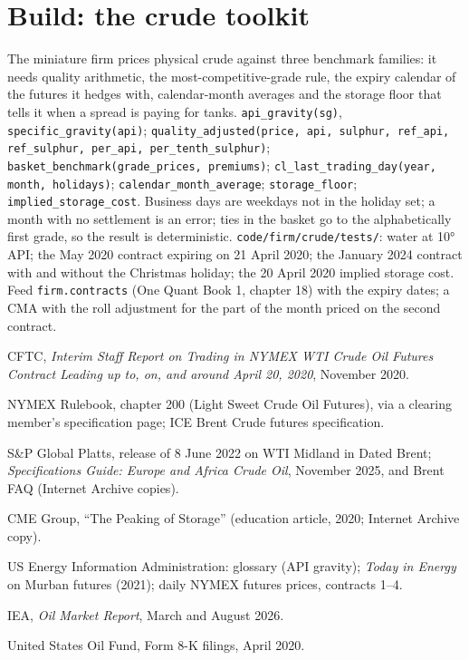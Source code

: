 \section{Build: the crude toolkit}\label{bld:m3:crude-oil:crude}

\begin{build}
 The miniature firm prices physical crude against three benchmark
families: it needs quality arithmetic, the most-competitive-grade rule, the expiry
calendar of the futures it hedges with, calendar-month averages and the storage floor
that tells it when a spread is paying for tanks.
 \texttt{api\_gravity(sg)}, \texttt{specific\_gravity(api)};
\texttt{quality\_adjusted(price, api, sulphur, ref\_api, ref\_sulphur, per\_api,
per\_tenth\_sulphur)}; \texttt{basket\_benchmark(grade\_prices, premiums)};
\texttt{cl\_last\_trading\_day(year, month, holidays)};
\texttt{calendar\_month\_average}; \texttt{storage\_floor};
\texttt{implied\_storage\_cost}.
 Business days are weekdays not in the holiday set; a month with no
settlement is an error; ties in the basket go to the alphabetically first grade, so
the result is deterministic.
 \texttt{code/firm/crude/tests/}: water at 10° API; the
May 2020 contract expiring on 21 April 2020; the January 2024 contract with and without
the Christmas holiday; the 20 April 2020 implied storage cost.
 Feed \texttt{firm.contracts} (One Quant Book 1, chapter 18) with the
expiry dates; a CMA with the roll adjustment for the part of the month priced on the
second contract.
\end{build}

\begin{omsources}
\item CFTC, \emph{Interim Staff Report on Trading in NYMEX WTI Crude Oil Futures
Contract Leading up to, on, and around April 20, 2020}, November 2020.
\item NYMEX Rulebook, chapter 200 (Light Sweet Crude Oil Futures), via a clearing
member's specification page; ICE Brent Crude futures specification.
\item S\&P Global Platts, release of 8 June 2022 on WTI Midland in Dated Brent; \emph{Specifications Guide: Europe and Africa Crude
Oil}, November 2025, and Brent FAQ (Internet Archive copies).
\item CME Group, ``The Peaking of Storage'' (education article, 2020; Internet Archive copy).
\item US Energy Information Administration: glossary (API gravity); \emph{Today in
Energy} on Murban futures (2021); daily NYMEX futures prices, contracts 1--4.
\item IEA, \emph{Oil Market Report}, March and August 2026.
\item United States Oil Fund, Form 8-K filings, April 2020.
\end{omsources}

